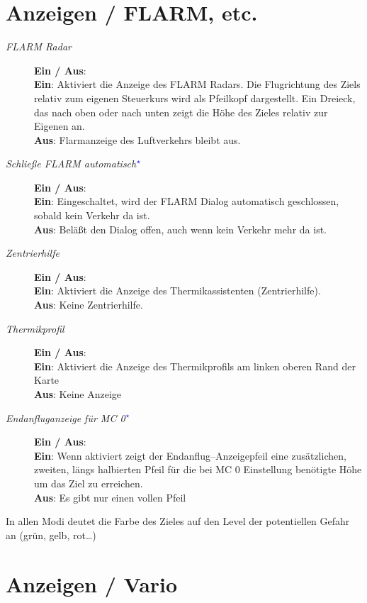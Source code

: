 \section{Anzeigen / FLARM, etc.} \label{sec:flarmandother-gauge}

\begin{description}
\item[\textit{FLARM Radar}]  \label{conf:flarmdisplay} {\bf Ein / Aus}: \\
{\bf Ein}: Aktiviert die Anzeige des FLARM Radars. Die Flugrichtung des Ziels relativ zum eigenen Steuerkurs wird als Pfeilkopf dargestellt.
Ein Dreieck, das nach oben oder nach unten zeigt die Höhe des Zieles relativ zur Eigenen an.
\\
{\bf Aus}: Flarmanzeige des Luftverkehrs  bleibt aus.
\item[\textit{Schließe FLARM automatisch$^{\textcolor{blue}{\star}}$}] {\bf Ein / Aus}: \\
{\bf Ein}: Eingeschaltet, wird der FLARM Dialog automatisch geschlossen, sobald kein Verkehr da ist.\\
{\bf Aus}: Beläßt den Dialog offen, auch wenn kein Verkehr mehr da ist.
\item[\textit{Zentrierhilfe}] \label{conf:thermalassistant} {\bf Ein / Aus}: \\
{\bf Ein}: Aktiviert die Anzeige des Thermikassistenten (Zentrierhilfe).\\
{\bf Aus}: Keine Zentrierhilfe.
\item[\textit{Thermikprofil}] \label{conf:thermalband} {\bf Ein / Aus}: \\ 
{\bf Ein}: Aktiviert die Anzeige des Thermikprofils am linken oberen Rand der Karte\\
{\bf Aus}: Keine Anzeige
\item[\textit{Endanfluganzeige für MC 0$^{\textcolor{blue}{\star}}$}] {\bf Ein / Aus}:\\
{\bf Ein}: Wenn aktiviert zeigt der Endanflug--Anzeigepfeil eine zusätzlichen, zweiten, längs halbierten Pfeil für die bei MC 0 Einstellung benötigte Höhe 
um das Ziel zu erreichen.\\
{\bf Aus}: Es gibt nur einen vollen Pfeil
\end{description}

In allen Modi deutet die Farbe des Zieles auf den Level der potentiellen Gefahr an (grün, gelb, rot\dots)


\section{Anzeigen / Vario}\label{sec:vario-gauge}

